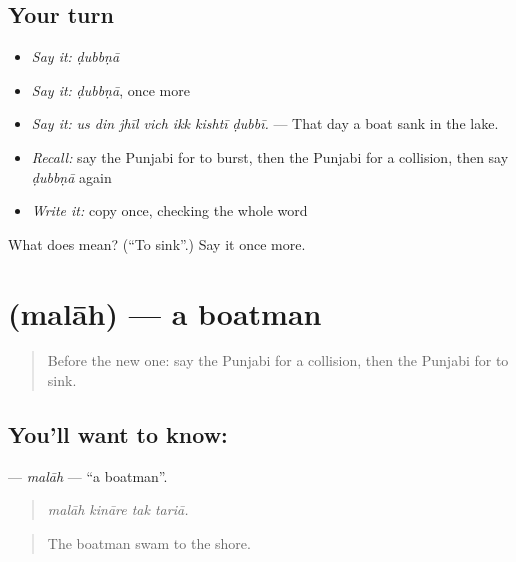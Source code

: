\subsection*{Your turn}
\begin{itemize}
\raggedright
  \item \emph{Say it:} \emph{ḍubbṇā}
  \item \emph{Say it:} \emph{ḍubbṇā}, once more
  \item \emph{Say it:} \emph{us din jhīl vich ikk kishtī ḍubbī.} — That day a boat sank in the lake.
  \item \emph{Recall:} say the Punjabi for to burst, then the Punjabi for a collision, then say \emph{ḍubbṇā} again
  \item \emph{Write it:} copy \textbf{} once, checking the whole word
\end{itemize}

\begin{tcolorbox}[breakable,colback=teal!4,colframe=teal!35!black,title={Before you move on}]
What does  mean? (\textquotedblleft{}To sink\textquotedblright{}.) Say it once more.
\end{tcolorbox}
\section[\texorpdfstring{\pa{ਮਲਾਹ} (malāh)}{ਮਲਾਹ (malāh)}]{ (malāh) — a boatman}

\label{lesson:PA-C318-malah}



\begin{quote}
Before the new one: say the Punjabi for a collision, then the Punjabi for to sink.
\end{quote}

\subsection*{You'll want to know: }
\textbf{} — \emph{malāh} — \textquotedblleft{}a boatman\textquotedblright{}.

\begin{quote}
   
\end{quote}

\begin{quote}
\emph{malāh kināre tak tariā.}
\end{quote}

\begin{quote}
The boatman swam to the shore.
\end{quote}

